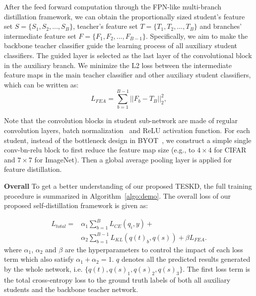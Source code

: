 \documentclass[letterpaper]{article} %
\newcommand{\rewrite}[1]{{\textcolor{red}{#1}}}
\begin{document}
After the feed forward computation through the FPN-like multi-branch distillation framework, we can obtain the proportionally sized student's feature set $S=\{S_{1}, S_{2}, ..., S_{B}\}$, teacher's feature set $T=\{T_{1}, T_{2}, ..., T_{B}\}$ and branches' intermediate feature set $F=\{F_{1}, F_{2}, ..., F_{B-1}\}$. Specifically, we aim to make the backbone teacher classifier guide the learning process of all auxiliary student classifiers. The guided layer is selected as the last layer of the convolutional block in the auxiliary branch.
We minimize the L2 loss between the intermediate feature maps in the main teacher classifier and other auxiliary student classifiers, which can be written as:
\begin{equation}
L_{FEA}= \sum_{b=1}^{B-1} ||F_{b}-T_{B}||_{2}^{2},
\end{equation}

Note that the convolution blocks in student sub-network are made of regular convolution layers, batch normalization~\cite{ioffe2015batch} and ReLU activation function.  For each student, instead of the bottleneck design in BYOT~\cite{zhang2019your}, we construct a simple single conv-bn-relu block to first reduce the feature map size (e.g., to $4\times4$ for CIFAR and $7\times7$ for ImageNet). Then a global average pooling layer is applied for feature distillation.

\textbf{Overall} To get a better understanding of our proposed TESKD, the full training procedure is summarized in Algorithm~\ref{algo:demo}. The overall loss of our proposed self-distillation framework is given as:

\begin{equation}
\begin{aligned}
L_{total}= & \alpha_{1} \sum_{b=1}^{B} L_{CE}(q_{i},y) + \\ & \alpha_{2} \sum_{b=1}^{B-1}L_{KL}(q(t)_{b},q(s)) + \beta L_{FEA}.
\end{aligned}
\end{equation}
where $\alpha_{1}$, $\alpha_{2}$ and $\beta$ are the hyperparameters to control the impact of each loss term which also satisfy $\alpha_{1}+\alpha_{2}=1$. $q$ denotes all the predicted results generated by the whole network, i.e. $\{q(t),q(s)_{1},q(s)_{2},q(s)_{3}\}$. The first loss term is the total cross-entropy loss to the ground truth labels of both all auxiliary students and the backbone teacher network.
\end{document}
